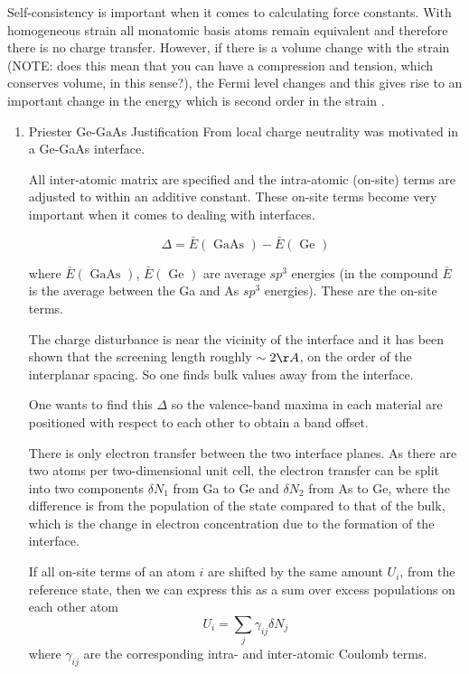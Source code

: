 \documentclass[11pt]{article}
\begin{document}
\begin{enumerate}
\begin{enumerate}
\begin{enumerate}
Self-consistency is important when it comes to calculating force
constants. With homogeneous strain all monatomic basis atoms remain equivalent
and therefore there is no charge transfer. 
However, if there is a volume change with the strain (NOTE: does this mean
that you can have a compression and tension, which conserves volume, in this
sense?), the Fermi level changes
and this gives rise to an important change in the energy which is second order
in the strain \cite{Heine1980}. 

\begin{enumerate}
\item Priester Ge-GaAs Justification
\label{sec:orgbe458a3}
From \cite{Priester1986} local charge neutrality was motivated in a Ge-GaAs
interface. 

All inter-atomic matrix are specified and the intra-atomic (on-site) terms are
adjusted to within an additive constant. These on-site terms become very
important when it comes to dealing with interfaces. 

\[
\Delta = \bar{ E }( \text{ GaAs } ) - \bar{ E }( \text{ Ge } )
\]

where \(\bar{ E }( \text{ GaAs } )\), \(\bar{ E }( \text{ Ge } )\) are average \(sp^3\) energies 
(in the compound \(\bar{E}\) is the average between the Ga and As \(sp^3\)
energies). These are the on-site terms. 

The charge disturbance is near the vicinity of the interface and it has been
shown that the screening length roughly \(\sim 2\AA\), on the order of the
interplanar spacing. So one finds bulk values away from the interface. 

One wants to find this \(\Delta\) so the valence-band maxima in each material
are positioned with respect to each other to obtain a band offset. 

There is only electron transfer between the two
interface planes. As there are two atoms per two-dimensional unit cell, the
electron transfer can be split into two components \(\delta N_1\) from Ga to Ge
and \(\delta N_2\) from As to Ge, where the difference is from the population of
the state compared to that of the bulk, which is the change in electron
concentration due to the formation of the interface. 

If all on-site terms of an atom \(i\) are shifted by the same
amount \(U_{i}\), from the reference state, then we can express this as a sum
over excess populations on each other atom
\[
U_{i} = \sum_{j} \gamma_{ij} \delta N_{j}
\] 
where \(\gamma_{ij}\) are the corresponding intra- and inter-atomic Coulomb
terms. 


\end{enumerate}
\end{enumerate}
\end{enumerate}
\end{enumerate}
\end{document}
